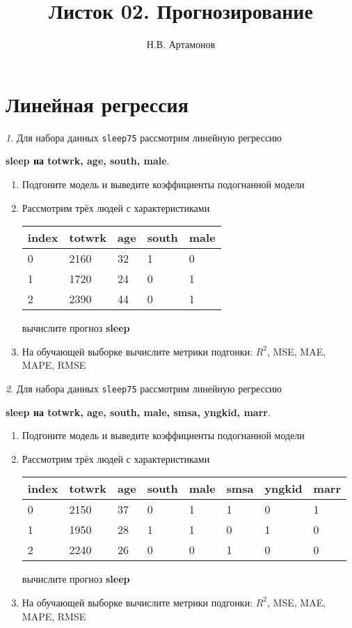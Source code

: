 \documentclass[12pt]{article}
\title{Листок 02. Прогнозирование}
\author{Н.В. Артамонов}
\theoremstyle{remark}
\newtheorem{exercise}{}[section]
\begin{document}
\maketitle

\tableofcontents

\section{Линейная регрессия}

\begin{exercise}
Для набора данных \texttt{sleep75} рассмотрим линейную регрессию 
\begin{center}
	\textbf{sleep на totwrk, age, south, male}.
\end{center}
\begin{enumerate}
	\item Подгоните модель и выведите коэффициенты подогнанной модели
	\item Рассмотрим трёх людей с характеристиками
	\begin{center}
		\begin{tabular}{|l||l|l|l|l|}\hline
			index & totwrk & age & south & male \\ \hline\hline
			0 & 2160 & 32 & 1 & 0 \\
			1 & 1720 & 24 & 0 & 1 \\
			2 & 2390 & 44 & 0 & 1 \\ \hline
		\end{tabular}
	\end{center}
	вычислите прогноз \textbf{sleep} 
	\item На обучающей выборке вычислите метрики подгонки: \(R^2\), 
	MSE, MAE, MAPE, RMSE
\end{enumerate}
\end{exercise}

\begin{exercise}
Для набора данных \texttt{sleep75} рассмотрим линейную регрессию 
\begin{center}
	\textbf{sleep на totwrk, age, south, male, smsa, yngkid, marr}.
\end{center}
\begin{enumerate}
	\item Подгоните модель и выведите коэффициенты подогнанной модели
	\item Рассмотрим трёх людей с характеристиками
	\begin{center}
		\begin{tabular}{|l||l|l|l|l|l|l|l|}\hline
			index & totwrk & age & south & male & smsa & yngkid & marr \\ \hline\hline
			0 & 2150 & 37 & 0 & 1 & 1 & 0 & 1 \\
			1 & 1950 & 28 & 1 & 1 & 0 & 1 & 0 \\
			2 & 2240 & 26 & 0 & 0 & 1 & 0 & 0 \\ \hline
		\end{tabular}
	\end{center}
	вычислите прогноз \textbf{sleep} 
	\item На обучающей выборке вычислите метрики подгонки: \(R^2\), 
	MSE, MAE, MAPE, RMSE
\end{enumerate}
\end{exercise}
\end{document}
